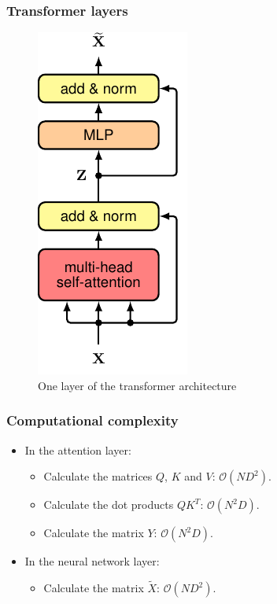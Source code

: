 \documentclass{beamer}
\begin{document}
\begin{frame}
    \frametitle{Transformer layers}
    \begin{figure}
        \caption{One layer of the transformer architecture}
        \includegraphics[height=0.7\textheight]{Figure_9.pdf}
    \end{figure}
\end{frame}

\begin{frame}
    \frametitle{Computational complexity}
    \begin{itemize}
        \item In the attention layer:
        \begin{itemize}
            \item Calculate the matrices $Q$, $K$ and $V$: $\mathcal{O}(ND^{2})$.
            \item Calculate the dot products $QK^{T}$: $\mathcal{O}(N^{2}D)$.
            \item Calculate the matrix $Y$: $\mathcal{O}(N^{2}D)$.
        \end{itemize}
        \item In the neural network layer:
        \begin{itemize}
            \item Calculate the matrix $\tilde{X}$: $\mathcal{O}(ND^{2})$.
        \end{itemize}
    \end{itemize}
\end{frame}
\end{document}
